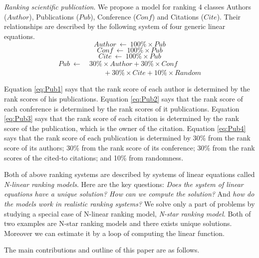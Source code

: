 \documentclass[10pt,leqno,twoside]{article}
\begin{document}
\textit{Ranking scientific publication}. We propose a model for ranking 4 classes Authors ($Author$), Publications ($Pub$), Conference ($Conf$) and Citations ($Cite$). Their relationships are described by the following system of four generic linear equations.
{\small
\begin{equation}\label{eq:Pub1}
Author ~\longleftarrow~ 100\% \times Pub
\end{equation}
\begin{equation}\label{eq:Pub2}
Conf ~\longleftarrow~ 100\% \times Pub
\end{equation}
\begin{equation}\label{eq:Pub3}
Cite ~\longleftarrow~ 100\% \times Pub
\end{equation}
\begin{equation}\label{eq:Pub4}
\begin{split}
Pub ~\longleftarrow~ &30\% \times Author +  30\% \times Conf\\
&\qquad +  30\% \times Cite+  10\% \times Random
\end{split}
\end{equation}
}

Equation \ref{eq:Pub1} says that the rank score of each author is determined by the rank scores of his publications. Equation \ref{eq:Pub2} says that the rank score of each conference is determined by the rank scores of it publications. Equation \ref{eq:Pub3} says that the rank score of each citation is determined by the rank score of the publication, which is the owner of the citation. Equation \ref{eq:Pub4} says that the rank score of each publication is determined by 30\% from the rank score of its authors; 30\% from the rank score of its conference; 30\% from the rank scores of the cited-to citations; and 10\% from randomness.

Both of above ranking systems are described by systems of linear equations called \textit{N-linear ranking models}. Here are the key questions: \textit{Does the system of linear equations have a unique solution? How can we compute the solution?} And \textit{how do the models work in realistic ranking systems?} We solve only a part of problems by studying a special case of N-linear ranking model, \textit{N-star ranking model}. Both of two examples are N-star ranking models  and there exists unique solutions. Moreover we can estimate it by a loop of computing the linear function.


The main contributions and outline of this paper are as follows.
\end{document}
